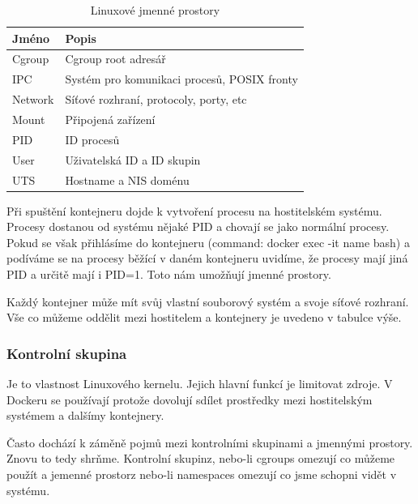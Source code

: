 \begin{table}[!ht]
  \begin{center}
	\caption{Linuxové jmenné prostory}
    \label{tab:Jmenne prostory}
    \begin{tabular}{|l|l|} 
    	  \hline
      \textbf{Jméno} & \textbf{Popis} \\
      \hline

	  Cgroup  &  Cgroup root adresář\\
	  IPC     &  Systém pro komunikaci procesů, POSIX fronty\\
	  Network &  Síťové rozhraní, protocoly, porty, etc\\
      Mount   &  Připojená zařízení\\
      PID     &  ID procesů\\
      User    &  Uživatelská ID a ID skupin\\
      UTS     &  Hostname a NIS doménu\\   
      
      \hline
    \end{tabular}
  \end{center}
\end{table}

Při spuštění kontejneru dojde k vytvoření procesu na hostitelském systému. Procesy dostanou od systému nějaké PID a chovají se jako normální procesy. Pokud se však přihlásíme do kontejneru (command: docker exec -it name bash) a podíváme se na procesy běžící v daném kontejneru uvidíme, že procesy mají jiná PID a určitě mají i PID=1. Toto nám umožňují jmenné prostory.

Každý kontejner může mít svůj vlastní souborový systém a svoje síťové rozhraní. Vše co můžeme oddělit mezi hostitelem a kontejnery je uvedeno v tabulce výše. 

\subsubsection{Kontrolní skupina}

Je to vlastnost Linuxového kernelu. Jejich hlavní funkcí je limitovat zdroje. V Dockeru se používají protože dovolují sdílet prostředky mezi hostitelským systémem a dalšímy kontejnery. 

Často dochází k záměně pojmů mezi kontrolními skupinami a jmennými prostory. Znovu to tedy shrňme. Kontrolní skupinz, nebo-li cgroups omezují co můžeme použít a jemenné prostorz nebo-li namespaces omezují co jsme schopni vidět v systému. 

